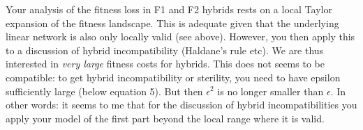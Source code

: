 \begin{point}{}
    Your analysis of the fitness loss in F1 and F2 hybrids rests on a local
Taylor expansion of the fitness landscape. This is adequate given that the
underlying linear network is also only locally valid (see above). However, you
then apply this to a discussion of hybrid incompatibility (Haldane's rule etc).
We are thus interested in \emph{very large} fitness costs for hybrids. This does not
seems to be compatible: to get hybrid incompatibility or sterility, you need to
have epsilon sufficiently large (below equation 5). But then $\epsilon^2$ is no
longer smaller than $\epsilon$. In other words: it seems to me that for the
discussion of hybrid incompatibilities you apply your model of the first part
beyond the local range where it is valid.
\end{point}




